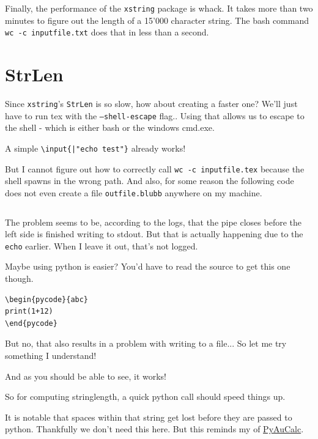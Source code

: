 \documentclass{article} \usepackage[utf8]{inputenc}
\makeatletter
\newenvironment{pycode}[1]%
{\xdef\d@tn@me{#1}\xdef\r@ncmd{python #1.py > #1.plog}%
\typeout{Writing file #1}\VerbatimOut{#1.py}%
}
{\endVerbatimOut %
\toks0{\immediate\write18}%
\expandafter\toks\expandafter1\expandafter{\r@ncmd}%
 \edef\d@r@ncmd{\the\toks0{\the\toks1}}\d@r@ncmd %
 \noindent Input
 \inputminted{python}{\d@tn@me.py}%
 \noindent Output
 \inputminted{text}{\d@tn@me.plog}%
 }
\makeatother
\begin{document}
Finally, the performance of the \texttt{xstring} package is whack. It takes more than two minutes to figure out the length of a 15'000 character string. The bash command \texttt{wc -c inputfile.txt} does that in less than a second.
\clearpage
\section{StrLen}
Since \texttt{xstring}'s \texttt{StrLen} is so slow, how about creating a faster one?
We'll just have to run tex with the \texttt{--shell-escape} flag.. Using that allows us to escape to the shell - which is either bash or the windows cmd.exe.

A simple \texttt{\textbackslash input\{|"echo test"\}} already works!


But I cannot figure out how to correctly call \texttt{wc -c inputfile.tex} because the shell spawns in the wrong path. And also, for some reason the following code does not even create a file \texttt{outfile.blubb} anywhere on my machine.
\begin{lstlisting}

\end{lstlisting}
The problem seems to be, according to the logs, that the pipe closes before the left side is finished writing to stdout. But that is actually happening due to the \texttt{echo} earlier. When I leave it out, that's not logged.

Maybe using python is easier? You'd have to read the source to get this one though.
\begin{lstlisting}
\begin{pycode}{abc}
print(1+12)
\end{pycode}
\end{lstlisting}
But no, that also results in a problem with writing to a file... So let me try something I understand!
\begin{mycode}

\end{mycode}

\newline
And as you should be able to see, it works!

So for computing stringlength, a quick python call should speed things up.
\begin{mycode}

\end{mycode}

\newline
It is notable that spaces within that string get lost before they are passed to python. Thankfully we don't need this here. But this reminds my of \href{https://ctftime.org/writeup/21982}{PyAuCalc}.
\end{document}
